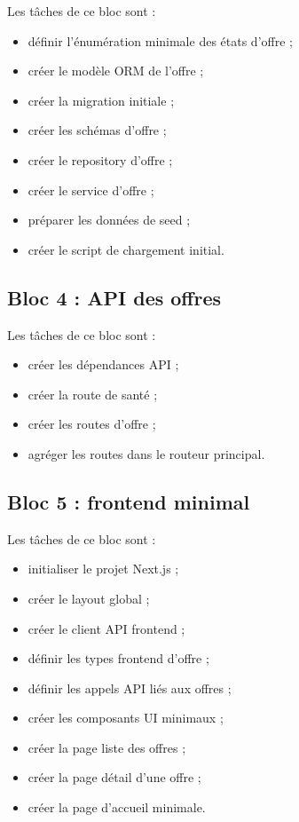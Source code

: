 \documentclass[11pt,a4paper]{article}
\begin{document}
Les tâches de ce bloc sont :

\begin{itemize}
    \item définir l’énumération minimale des états d’offre ;
    \item créer le modèle ORM de l’offre ;
    \item créer la migration initiale ;
    \item créer les schémas d’offre ;
    \item créer le repository d’offre ;
    \item créer le service d’offre ;
    \item préparer les données de seed ;
    \item créer le script de chargement initial.
\end{itemize}

\subsection{Bloc 4 : API des offres}

Les tâches de ce bloc sont :

\begin{itemize}
    \item créer les dépendances API ;
    \item créer la route de santé ;
    \item créer les routes d’offre ;
    \item agréger les routes dans le routeur principal.
\end{itemize}

\subsection{Bloc 5 : frontend minimal}

Les tâches de ce bloc sont :

\begin{itemize}
    \item initialiser le projet Next.js ;
    \item créer le layout global ;
    \item créer le client API frontend ;
    \item définir les types frontend d’offre ;
    \item définir les appels API liés aux offres ;
    \item créer les composants UI minimaux ;
    \item créer la page liste des offres ;
    \item créer la page détail d’une offre ;
    \item créer la page d’accueil minimale.
\end{itemize}
\end{document}
